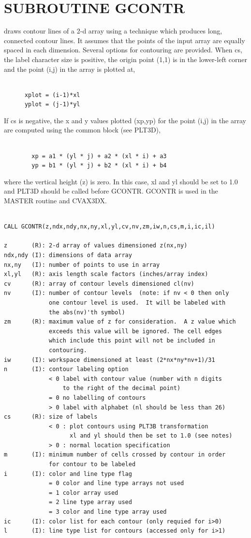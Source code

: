 \documentclass[11pt]{report}
\begin{document}
\section{SUBROUTINE GCONTR}

 draws contour lines of a 2-d array using a technique which
produces long, connected contour lines.  It assumes that the points
of the input array are equally spaced in each dimension.  Several
options for contouring are provided.  When cs, the label character size
is positive, the origin point (1,1) is in the
lower-left corner and the point (i,j) in the array is plotted at,
\begin{verbatim}

      xplot = (i-1)*xl
      yplot = (j-1)*yl

\end{verbatim}
If cs is negative, the x and y values plotted (xp,yp) for the point
(i,j) in the array are computed using
the   common block  (see PLT3D),
\begin{verbatim}

        xp = a1 * (yl * j) + a2 * (xl * i) + a3
        yp = b1 * (yl * j) + b2 * (xl * i) + b4
\end{verbatim}
where the vertical height (z) is zero.  In this case, xl and yl
should be set to 1.0 and PLT3D should be called before GCONTR.
GCONTR is used in the MASTER routine  and CVAX3DX.
\begin{verbatim}

CALL GCONTR(z,ndx,ndy,nx,ny,xl,yl,cv,nv,zm,iw,n,cs,m,i,ic,il)

z       (R): 2-d array of values dimensioned z(nx,ny)
ndx,ndy (I): dimensions of data array
nx,ny   (I): number of points to use in array
xl,yl   (R): axis length scale factors (inches/array index)
cv      (R): array of contour levels dimensioned cl(nv)
nv      (I): number of contour levels  (note: if nv < 0 then only
             one contour level is used.  It will be labeled with
             the abs(nv)'th symbol)
zm      (R): maximum value of z for consideration.  A z value which
             exceeds this value will be ignored. The cell edges
             which include this point will not be included in
             contouring.
iw      (I): workspace dimensioned at least (2*nx*ny*nv+1)/31
n       (I): contour labeling option
             < 0 label with contour value (number with n digits
                 to the right of the decimal point)
             = 0 no labelling of contours
             > 0 label with alphabet (nl should be less than 26)
cs      (R): size of labels
             < 0 : plot contours using PLT3B transformation
                   xl and yl should then be set to 1.0 (see notes)
             > 0 : normal location specification
m       (I): minimum number of cells crossed by contour in order
             for contour to be labeled
i       (I): color and line type flag
             = 0 color and line type arrays not used
             = 1 color array used
             = 2 line type array used
             = 3 color and line type array used
ic      (I): color list for each contour (only requied for i>0)
l       (I): line type list for contours (accessed only for i>1)
\end{verbatim}
\end{document}
